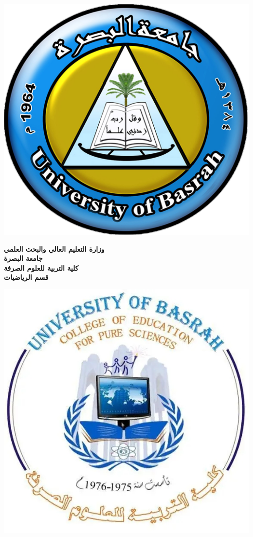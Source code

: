 \begin{Arabic}
\begin{titlepage}
\begin{minipage}{0.2\textwidth}
\raggedleft\includegraphics[scale=0.2]{Pictures/20231126094730!جامعة_البصرة.png}
\end{minipage}
\hfill
\begin{minipage}{0.5\textwidth}
    \centering
   \large \textbf{وزارة التعليم العالي والبحث العلمي}\\
    \textbf{جامعة البصرة}\\
    \textbf{كلية التربية للعلوم الصرفة}\\
    \textbf{قسم الرياضيات}
\end{minipage}
\hfill
\begin{minipage}{0.2\textwidth}
\raggedright\includegraphics[scale=0.2]{Pictures/FB_IMG_17029184953253241.jpg}   

\end{minipage}
\end{titlepage}
\end{Arabic}
